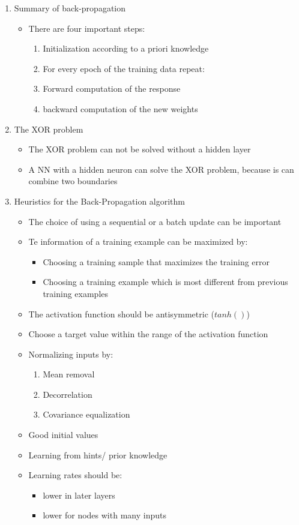 \documentclass{scrartcl}
\begin{document}
\begin{enumerate}
\item Summary of back-propagation
	\begin{itemize}
	\item There are four important steps:
		\begin{enumerate}
		\item Initialization according to a priori knowledge
		\item For every epoch of the training data repeat:
		\item Forward computation of the response
		\item backward computation of the new weights
		\end{enumerate}
	\end{itemize}
	
\item The XOR problem
	\begin{itemize}
	\item The XOR problem can not be solved without a hidden layer
	\item A NN with a hidden neuron can solve the XOR problem, because is can combine two boundaries
	\end{itemize}
	
\item Heuristics for the Back-Propagation algorithm
	\begin{itemize}
	\item The choice of using a sequential or a batch update can be important
	\item Te information of a training example can be maximized by:
		\begin{itemize}
		\item Choosing a training sample that maximizes the training error
		\item Choosing a training example which is most different from previous training examples
		\end{itemize}
	\item The activation function should be antisymmetric ($tanh()$)
	\item Choose a target value within the range of the activation function
	\item Normalizing inputs by:
		\begin{enumerate}
		\item Mean removal
		\item Decorrelation
		\item Covariance equalization
		\end{enumerate}
	\item Good initial values
	\item Learning from hints/ prior knowledge
	\item Learning rates should be:
		\begin{itemize}
		\item lower in later layers
		\item lower for nodes with many inputs
		\end{itemize}
	\end{itemize}
\end{enumerate}
\end{document}
